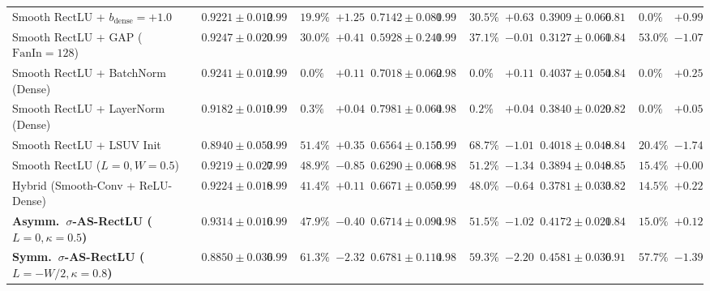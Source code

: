 \documentclass[10pt,a4paper]{article}
\begin{document}
\begin{table}[t]
\begin{tabular}{lcccccccccccc}
Smooth RectLU + $b_{\text{dense}}=+1.0$ & $0.9221 \pm 0.012$ & $0.9991$ & $19.9\%$ & $+1.25$ & $0.7142 \pm 0.081$ & $0.9911$ & $30.5\%$ & $+0.63$ & $0.3909 \pm 0.066$ & $0.8197$ & $0.0\%$ & $+0.99$ \\
Smooth RectLU + GAP ($\text{FanIn}=128$) & $0.9247 \pm 0.020$ & $0.9993$ & $30.0\%$ & $+0.41$ & $0.5928 \pm 0.241$ & $0.9909$ & $37.1\%$ & $-0.01$ & $0.3127 \pm 0.061$ & $0.8428$ & $53.0\%$ & $-1.07$ \\
Smooth RectLU + BatchNorm (Dense) & $0.9241 \pm 0.012$ & $0.9976$ & $0.0\%$ & $+0.11$ & $0.7018 \pm 0.062$ & $0.9872$ & $0.0\%$ & $+0.11$ & $0.4037 \pm 0.054$ & $0.8410$ & $0.0\%$ & $+0.25$ \\
Smooth RectLU + LayerNorm (Dense) & $0.9182 \pm 0.019$ & $0.9985$ & $0.3\%$ & $+0.04$ & $\mathbf{0.7981 \pm 0.064}$ & $0.9819$ & $0.2\%$ & $+0.04$ & $0.3840 \pm 0.029$ & $0.8208$ & $0.0\%$ & $+0.05$ \\
Smooth RectLU + LSUV Init~\cite{mishkin2016} & $0.8940 \pm 0.053$ & $0.9994$ & $51.4\%$ & $+0.35$ & $0.6564 \pm 0.155$ & $0.9935$ & $68.7\%$ & $-1.01$ & $0.4018 \pm 0.048$ & $0.8444$ & $20.4\%$ & $-1.74$ \\
Smooth RectLU ($L=0, W=0.5$) & $0.9219 \pm 0.027$ & $\mathbf{0.9995}$ & $48.9\%$ & $-0.85$ & $0.6290 \pm 0.068$ & $0.9872$ & $51.2\%$ & $-1.34$ & $0.3894 \pm 0.048$ & $0.8577$ & $15.4\%$ & $+0.00$ \\
Hybrid (Smooth-Conv + ReLU-Dense) & $0.9224 \pm 0.018$ & $0.9992$ & $41.4\%$ & $+0.11$ & $0.6671 \pm 0.059$ & $0.9901$ & $48.0\%$ & $-0.64$ & $0.3781 \pm 0.033$ & $0.8225$ & $14.5\%$ & $+0.22$ \\
\textbf{Asymm.\ $\sigma$-AS-RectLU ($L=0, \kappa=0.5$)} & $\mathbf{0.9314 \pm 0.016}$ & $0.9993$ & $47.9\%$ & $-0.40$ & $0.6714 \pm 0.094$ & $0.9897$ & $51.5\%$ & $-1.02$ & $0.4172 \pm 0.021$ & $0.8455$ & $15.0\%$ & $+0.12$ \\
\textbf{Symm.\ $\sigma$-AS-RectLU ($L=-W/2, \kappa=0.8$)} & $0.8850 \pm 0.036$ & $0.9978$ & $61.3\%$ & $-2.32$ & $0.6781 \pm 0.114$ & $0.9895$ & $59.3\%$ & $-2.20$ & $\mathbf{0.4581 \pm 0.036}$ & $\mathbf{0.9172}$ & $57.7\%$ & $-1.39$ \\
\bottomrule
\end{tabular}
\end{table}
\end{document}
